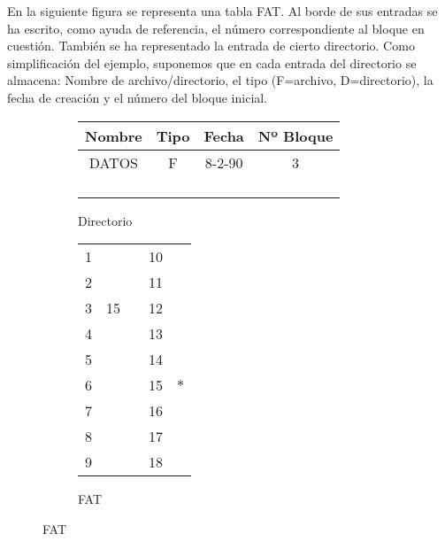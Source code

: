 \begin{ejercicio}
En la siguiente figura se representa una tabla FAT. Al borde de sus entradas se ha escrito, como ayuda de referencia, el número correspondiente al bloque en cuestión. También se ha representado la entrada de cierto directorio. Como simplificación del ejemplo, suponemos que en cada entrada del directorio se almacena: Nombre de archivo/directorio, el tipo (F=archivo, D=directorio), la fecha de creación y el número del bloque inicial.

    \begin{figure}[H]
        \centering
        \begin{subfigure}[c]{0.5\textwidth}
            \centering
            \begin{tabular}{|c|c|c|c|}
                Nombre & Tipo & Fecha  & Nº Bloque \\ \hline \hline
                DATOS  & F    & 8-2-90 & 3         \\ \hline
                       &      &        &           \\ \hline
                       &      &        &           \\ \hline
                       &      &        &           \\ \hline
                       &      &        &           \\ \hline
            \end{tabular}
            \caption{Directorio}
        \end{subfigure}\hfill
        \begin{subfigure}[c]{0.5\textwidth}
            \centering
            \begin{tabular}{c|c|cc|c|}
                \cline{2-2} \cline{5-5}
                1 &  &\hspace{1cm}& 10 &  \\ \cline{2-2} \cline{5-5} 
                2 &  && 11 &  \\ \cline{2-2} \cline{5-5} 
                3 & 15 && 12 &  \\ \cline{2-2} \cline{5-5} 
                4 &  && 13 &  \\ \cline{2-2} \cline{5-5} 
                5 &  && 14 &  \\ \cline{2-2} \cline{5-5} 
                6 &  && 15 & $\ast$ \\ \cline{2-2} \cline{5-5} 
                7 &  && 16 &  \\ \cline{2-2} \cline{5-5} 
                8 &  && 17 &  \\ \cline{2-2} \cline{5-5} 
                9 &  && 18 &  \\ \cline{2-2} \cline{5-5} 
            \end{tabular}
            \caption{FAT}
        \end{subfigure}
    \end{figure}
    

\end{ejercicio}
